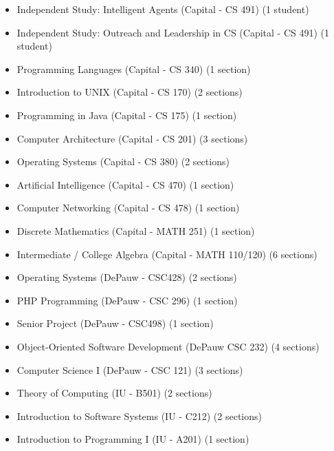 \documentclass[letterpaper,11pt]{article}
\begin{document}
\begin{itemize}
\item Independent Study: Intelligent Agents (Capital - CS 491) (1 student)
\item Independent Study: Outreach and Leadership in CS (Capital - CS 491) (1 student)
\item Programming Languages (Capital - CS 340) (1 section)
\item Introduction to UNIX (Capital - CS 170) (2 sections)
\item Programming in Java (Capital - CS 175) (1 section)
\item Computer Architecture (Capital - CS 201) (3 sections)
\item Operating Systems (Capital - CS 380) (2 sections)
\item Artificial Intelligence (Capital - CS 470) (1 section)
\item Computer Networking (Capital - CS 478) (1 section)
\item Discrete Mathematics (Capital - MATH 251) (1 section)
\item Intermediate / College Algebra (Capital - MATH 110/120) (6 sections)
\item Operating Systems (DePauw - CSC428) (2 sections)
\item PHP Programming (DePauw - CSC 296) (1 section)
\item Senior Project (DePauw - CSC498) (1 section)
\item Object-Oriented Software Development (DePauw CSC 232) (4 sections)
\item Computer Science I (DePauw - CSC 121) (3 sections)
\item Theory of Computing (IU - B501) (2 sections)
\item Introduction to Software Systems (IU - C212) (2 sections)
\item Introduction to Programming I (IU - A201) (1 section)
\end{itemize}
\end{document}
